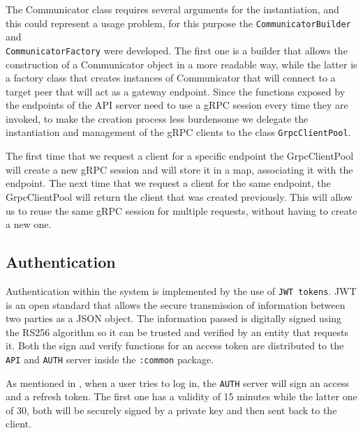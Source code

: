 \documentclass{scrartcl}
\begin{document}
The Communicator class requires several arguments for the instantiation, and this could represent a usage problem, for this purpose the \texttt{CommunicatorBuilder} and \\ \texttt{CommunicatorFactory} were developed. The first one is a builder that allows the construction of a Communicator object in a more readable way, while the latter is a factory class that creates instances of Communicator that will connect to a target peer that will act as a gateway endpoint. Since the functions exposed by the endpoints of the API server need to use a gRPC session every time they are invoked, to make the creation process less burdensome we delegate the instantiation and management of the gRPC clients to the class \texttt{GrpcClientPool}.


The first time that we request a client for a specific endpoint the GrpcClientPool will create a new gRPC session and will store it in a map, associating it with the endpoint. The next time that we request a client for the same endpoint, the GrpcClientPool will return the client that was created previously. This will allow us to reuse the same gRPC session for multiple requests, without having to create a new one.

\subsection{Authentication}
Authentication within the system is implemented by the use of \texttt{JWT tokens}. JWT \cite{jwt} is an open standard that allows the secure transmission of information between two parties as a JSON object. The information passed is digitally signed using the RS256 algorithm so it can be trusted and verified by an entity that requests it. Both the sign and verify functions for an access token are distributed to the \texttt{API} and \texttt{AUTH} server inside the \texttt{:common} package.

As mentioned in , when a user tries to log in, the \texttt{AUTH} server will sign an access and a refresh token. The first one has a validity of 15 minutes while the latter one of 30, both will be securely signed by a private key and then sent back to the client. 

\end{document}
